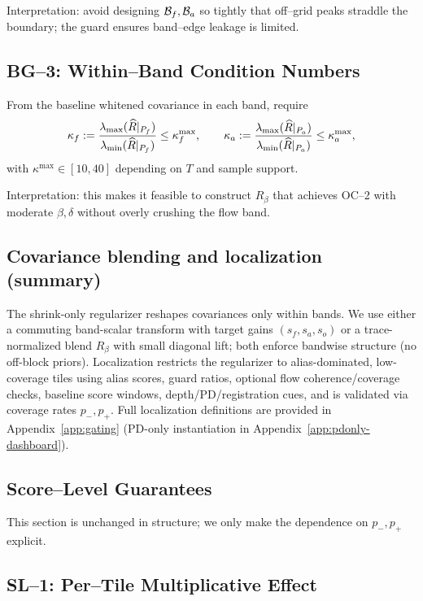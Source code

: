 Interpretation: avoid designing $\mathcal{B}_f,\mathcal{B}_a$ so tightly that off--grid peaks straddle the boundary; the guard ensures band--edge leakage is limited.

\subsection{BG--3: Within--Band Condition Numbers}

From the baseline whitened covariance in each band, require
\[
\kappa_f := \frac{\lambda_{\max}(\widehat R|_{P_f})}{\lambda_{\min}(\widehat R|_{P_f})} \le \kappa_f^{\max},\qquad
\kappa_a := \frac{\lambda_{\max}(\widehat R|_{P_a})}{\lambda_{\min}(\widehat R|_{P_a})} \le \kappa_a^{\max},
\]
with $\kappa^{\max}\in[10,40]$ depending on $T$ and sample support.

Interpretation: this makes it feasible to construct $R_\beta$ that achieves OC--2 with moderate $\beta,\delta$ without overly crushing the flow band.

\subsection{Covariance blending and localization (summary)}
\label{sec:cov-blending}

The shrink-only regularizer reshapes covariances only within bands. We use either a commuting band-scalar transform with target gains $(s_f,s_a,s_o)$ or a trace-normalized blend $R_\beta$ with small diagonal lift; both enforce bandwise structure (no off-block priors). Localization restricts the regularizer to alias-dominated, low-coverage tiles using alias scores, guard ratios, optional flow coherence/coverage checks, baseline score windows, depth/PD/registration cues, and is validated via coverage rates $p_-,p_+$. Full localization definitions are provided in Appendix~\ref{app:gating} (PD-only instantiation in Appendix~\ref{app:pdonly-dashboard}).

\subsection{Score--Level Guarantees}
\label{sec:score-level}

This section is unchanged in structure; we only make the dependence on $p_-,p_+$ explicit.

\subsection{SL--1: Per--Tile Multiplicative Effect}

